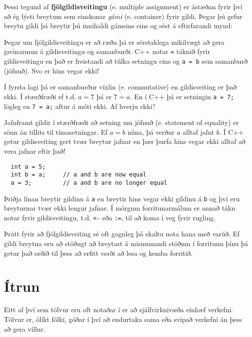 Þessi tegund af {\bf fjölgildisveitingu} (e. multiple assignment) er ástæðan fyrir því að
ég lýsti breytum sem einskonar {\em gámi} (e. container) fyrir gildi.
Þegar þú gefur breytu gildi þá breytir þú innihaldi gámsins eins og sést á eftirfarandi mynd:

\vspace{0.1in}
\centerline{}
\vspace{0.1in}

Þegar um fjölgildisveitingu er að ræða þá er sérstaklega mikilvægt að gera greinarmun á gildisveitingu og samanburði.
C++ notar {\tt =} táknið fyrir gildisveitingu en það er freistandi að túlka setningu eins og {\tt a = b} sem samanburð (jöfnuð).
Svo er hins vegar ekki!

Í fyrsta lagi þá er samanburður víxlin (e. commutative) en gildisveiting er það ekki.
Í stærðfræði ef t.d. $a = 7$ þá er $7 = a$.
En í C++ þá er setningin {\tt a = 7;} lögleg en {\tt 7 = a;} aftur á móti ekki. Af hverju ekki?

Jafnframt gildir í stærðfræði að setning um jöfnuð (e. statement of equality) er sönn án tillits til tímasetningar.
Ef $a = b$ núna, þá verður $a$ alltaf jafnt $b$.
Í C++ getur gildisveiting gert tvær breytur jafnar en þær þurfa hins vegar ekki alltaf að vera jafnar eftir það!

\begin{verbatim}
  int a = 5;
  int b = a;     // a and b are now equal
  a = 3;         // a and b are no longer equal
\end{verbatim}
%
Þriðja línan breytir gildinu á {\tt a} en breytir hins vegar ekki gildinu á {\tt b} og því eru breyturnar tvær ekki lengur jafnar.
Í mörgum forritunarmálum er annað tákn notar fyrir gildisveitingu, t.d. {\tt <-} eða {\tt :=}, til að koma í veg fyrir rugling.

Þrátt fyrir að fjölgildisveiting sé oft gagnleg þá skaltu nota hana með varúð.
Ef gildi breytna eru að stöðugt að breytast á mismunandi stöðum í forritunu þínu þá getur það orðið til þess að erfitt verði að lesa og kemba forritið.

\section{Ítrun}

Eitt af því sem tölvur eru oft notaðar í er að sjálfvirknivæða einhæf verkefni.
Tölvur er, ólíkt fólki, góðar í því að endurtaka sama eða svipað verkefni án þess að gera villur.

